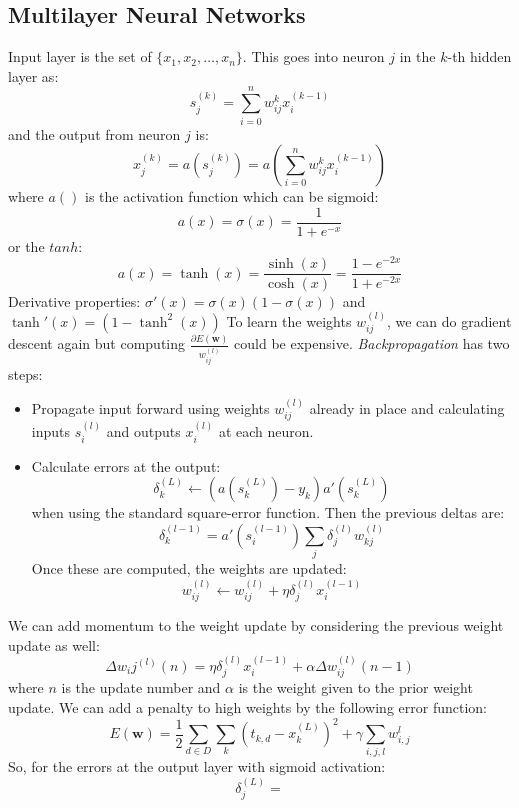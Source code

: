 \documentclass[a4paper,10pt]{article}
\begin{document}
\subsection{Multilayer Neural Networks}
Input layer is the set of $\{x_1, x_2, \ldots, x_n\}$.  This goes into neuron $j$ in the $k$-th hidden layer as:
$$
s_j^{(k)} = \sum_{i=0}^n w_{ij}^{k} x_i^{(k-1)}
$$
and the output from neuron $j$ is:
$$
x_j^{(k)} = a\left( s_j^{(k)}\right) = a\left(\sum_{i=0}^n w_{ij}^{k} x_i^{(k-1)}\right)
$$
where $a()$ is the activation function which can be sigmoid:
$$
a(x) = \sigma(x) = \frac{1}{1 + e^{-x}}
$$
or the $tanh$:
$$
a(x) = \tanh(x) = \frac{\sinh(x)}{\cosh(x)} = \frac{1- e^{-2x}}{1 + e^{-2x}}
$$
Derivative properties: $\sigma'(x) = \sigma(x)(1 - \sigma(x))$ and $\tanh'(x) = (1 - \tanh^2(x))$  To learn the weights $w_{ij}^{(l)}$, we can do gradient descent again but computing $\frac{\partial E(\mathbf{w})}{w_{ij}^{(l)}}$ could be expensive.  \emph{Backpropagation} has two steps:
\begin{itemize}
\item Propagate input forward using weights $w_{ij}^{(l)}$ already in place and calculating inputs $s_i^{(l)}$ and outputs $x_i^{(l)}$ at each neuron.  
\item Calculate errors at the output:
$$
\delta_k^{(L)} \leftarrow (a(s_k^{(L)}) - y_k) a'(s_k^{(L)})
$$
when using the standard square-error function.  Then the previous deltas are:
$$
\delta_k^{(l-1)} = a'(s_i^{(l-1)}) \sum_j \delta_j^{(l)} w_{kj}^{(l)}
$$
Once these are computed, the weights are updated:
$$
w_{ij}^{(l)} \leftarrow w_{ij}^{(l)} + \eta\delta_j^{(l)}x_{i}^{(l-1)}
$$
\end{itemize}
We can add momentum to the weight update by considering the previous weight update as well:
$$
\Delta w_ij^{(l)}(n) = \eta \delta_j^{(l)} x_i^{(l-1)} + \alpha\Delta w_{ij}^{(l)}(n-1)
$$
where $n$ is the update number and $\alpha$ is the weight given to the prior weight update.  We can add a penalty to high weights by the following error function:
$$
E(\mathbf{w}) = \frac{1}{2}\sum_{d\in D}\sum_{k} (t_{k,d} - x_k^{(L)})^2 + \gamma\sum_{i,j,l}w_{i,j}^{l}
$$
So, for the errors at the output layer with sigmoid activation:
$$
\delta_j^{(L)} = 
$$
\end{document}
